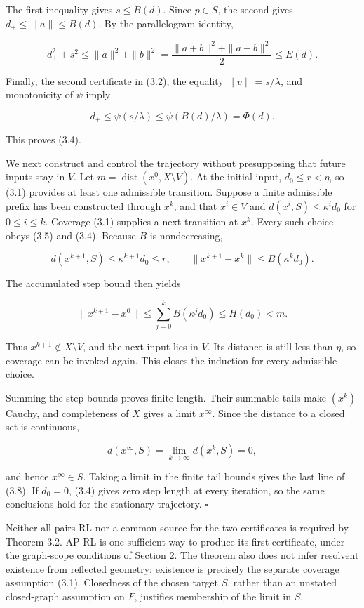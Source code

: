 \documentclass[11pt,a4paper]{article}
\theoremstyle{plain}
\theoremstyle{definition}
\theoremstyle{remark}
\begin{document}
The first inequality gives \(s\le B(d)\). Since \(p\in S\), the second
gives \(d_+\le\|a\|\le B(d)\). By the parallelogram identity,

\[
d_+^2+s^2
\le\|a\|^2+\|b\|^2
=\frac{\|a+b\|^2+\|a-b\|^2}{2}
\le E(d).
\tag{3.10}
\]

Finally, the second certificate in (3.2), the equality
\(\|v\|=s/\lambda\), and monotonicity of \(\psi\) imply

\[
d_+\le\psi(s/\lambda)
\le\psi(B(d)/\lambda)=\Phi(d).
\tag{3.11}
\]

This proves (3.4).

We next construct and control the trajectory without presupposing that
future inputs stay in \(V\). Let
\(m=\operatorname{dist}(x^0,X\setminus V)\). At the initial input,
\(d_0\le r<\eta\), so (3.1) provides at least one admissible transition.
Suppose a finite admissible prefix has been constructed through \(x^k\),
and that \(x^i\in V\) and \(d(x^i,S)\le\kappa^i d_0\) for
\(0\le i\le k\). Coverage (3.1) supplies a next transition at \(x^k\).
Every such choice obeys (3.5) and (3.4). Because \(B\) is nondecreasing,

\[
d(x^{k+1},S)\le\kappa^{k+1}d_0\le r,
\qquad
\|x^{k+1}-x^k\|\le B(\kappa^k d_0).
\tag{3.12}
\]

The accumulated step bound then yields

\[
\|x^{k+1}-x^0\|
\le\sum_{j=0}^{k}B(\kappa^j d_0)
\le H(d_0)<m.
\tag{3.13}
\]

Thus \(x^{k+1}\notin X\setminus V\), and the next input lies in \(V\).
Its distance is still less than \(\eta\), so coverage can be invoked
again. This closes the induction for every admissible choice.

Summing the step bounds proves finite length. Their summable tails make
\((x^k)\) Cauchy, and completeness of \(X\) gives a limit \(x^\infty\).
Since the distance to a closed set is continuous,

\[
d(x^\infty,S)=\lim_{k\to\infty}d(x^k,S)=0,
\]

and hence \(x^\infty\in S\). Taking a limit in the finite tail bounds
gives the last line of (3.8). If \(d_0=0\), (3.4) gives zero step length
at every iteration, so the same conclusions hold for the stationary
trajectory. \(\square\)

Neither all-pairs RL nor a common source for the two certificates is
required by Theorem 3.2. AP-RL is one sufficient way to produce its
first certificate, under the graph-scope conditions of Section 2. The
theorem also does not infer resolvent existence from reflected geometry:
existence is precisely the separate coverage assumption (3.1).
Closedness of the chosen target \(S\), rather than an unstated
closed-graph assumption on \(F\), justifies membership of the limit in
\(S\).
\end{document}
